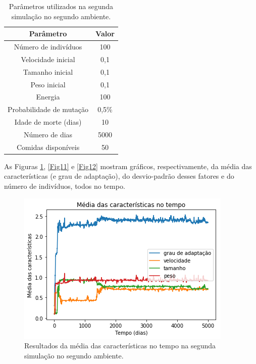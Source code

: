 \documentclass[10pt,brazil,english]{article}
\begin{document}
            \begin{table}[!hbtp]
                \centering
                \caption{Parâmetros utilizados na segunda simulação no segundo ambiente.}
                \label{Tab4}
                \begin{tabular}{c|c}
                    \hline
                    \textbf{Parâmetro}          & \textbf{Valor}    \\ \hline
                    Número de indivíduos        & 100               \\ \hline
                    Velocidade inicial          & 0,1               \\ \hline
                    Tamanho inicial             & 0,1               \\ \hline
                    Peso inicial                & 0,1               \\ \hline
                    Energia                     & 100               \\ \hline
                    Probabilidade de mutação    & 0,5\%             \\ \hline
                    Idade de morte (dias)       & 10                \\ \hline
                    Número de dias              & 5000              \\ \hline
                    Comidas disponíveis         & 50                \\ \hline
                \end{tabular}
            \end{table}
            
            As Figuras \ref{Fig10}, \ref{Fig11} e \ref{Fig12} mostram gráficos, respectivamente, da média das características (e grau de adaptação), do desvio-padrão desses fatores e do número de indivíduos, todos no tempo.
            
            \begin{figure}[!hbtp]
                \begin{center}
                    \includegraphics[scale=0.5]{Images/2-4.png}
                \end{center}
                \caption{Resultados da média das características no tempo na segunda simulação no segundo ambiente.}
                \label{Fig10}
            \end{figure} 
            
\end{document}
